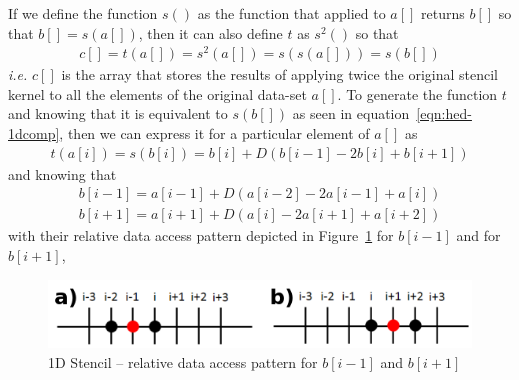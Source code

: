 \documentclass{acm_proc_article-sp}
\begin{document}
If we define the function $s()$ as the function that applied to $a[]$ returns $b[]$ so that $b[]=s(a[])$, then it can also define $t$ as $s^2()$ so that
\begin{equation}
  \begin{split}
    c[] = t(a[]) = s^2(a[]) = s(s(a[])) = s(b[])
  \end{split}
  \label{eqn:hed-1dcomp}
\end{equation}
\textit{i.e.} $c[]$ is the array that stores the results of applying twice the original stencil kernel to all the elements of the original data-set $a[]$. To generate the function $t$ and knowing that it is equivalent to $s(b[])$ as seen in equation~\eqref{eqn:hed-1dcomp}, then we can express it for a particular element of $a[]$ as
\begin{equation}
  \begin{split}
    t(a[i]) = s(b[i]) = b[i] + D(b[i-1] - 2b[i] + b[i+1])
  \end{split}
  \label{eqn:hed-1dcomp2}
\end{equation}
and knowing that 
\begin{equation}
  \begin{split}
    b[i-1] = a[i-1] + D(a[i-2] - 2a[i-1] + a[i])
  \end{split}
  \label{eqn:hed-1dp}
\end{equation}
\begin{equation}
  \begin{split}
    b[i+1] = a[i+1] + D(a[i] - 2a[i+1] + a[i+2])
  \end{split}
  \label{eqn:hed-1dp}
\end{equation}
with their relative data access pattern depicted in Figure~\ref{pic:1d-s01all} for $b[i-1]$ and for $b[i+1]$,
\begin{figure}[ht!]
  \centering
  \includegraphics[scale=0.6]{pics/stencil_grid/1d-s01_all}
  \caption{1D Stencil -- relative data access pattern for $b[i-1]$ and $b[i+1]$}
  \label{pic:1d-s01all}
\end{figure}
\end{document}
